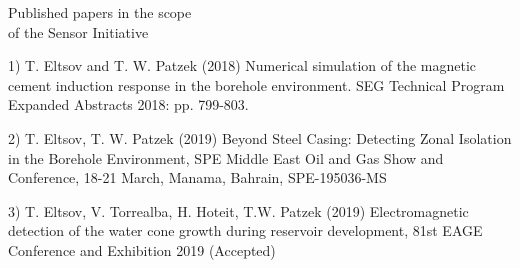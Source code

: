 \documentclass[aspectratio=169]{beamer}
\begin{document}
\begin{frame}{Published papers in the scope \\ of the Sensor Initiative}

1) T. Eltsov and T. W. Patzek (2018) Numerical simulation of the magnetic cement induction response in the borehole environment. SEG Technical Program Expanded Abstracts 2018: pp. 799-803. 

2) T. Eltsov, T. W. Patzek (2019) Beyond Steel Casing: Detecting Zonal Isolation in the Borehole Environment, SPE Middle East Oil and Gas Show and Conference, 18-21 March, Manama, Bahrain, SPE-195036-MS

3) T. Eltsov, V. Torrealba, H. Hoteit, T.W. Patzek (2019) Electromagnetic detection of the water cone growth during reservoir development, 81st EAGE Conference and Exhibition 2019 (Accepted)


\end{frame}
\end{document}
